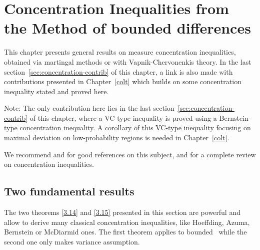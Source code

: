 \chapter{Concentration Inequalities from the Method of bounded differences}
\label{chap:back_concentration}
\begin{chapabstract}
This chapter presents general results on measure concentration inequalities, obtained via martingal methods or with Vapnik-Chervonenkis theory. In the last section~\ref{sec:concentration-contrib} of this chapter, a link is also made with contributions presented in Chapter~\ref{colt} which builds on some concentration inequality stated and proved here.
\end{chapabstract}

Note: The only contribution here lies in the last section~\ref{sec:concentration-contrib} of this chapter, where a VC-type inequality is proved using a Bernstein-type concentration inequality. A corollary of this VC-type inequality focusing on maximal deviation on low-probability regions is needed in Chapter~\ref{colt}.

We recommend \cite{McDiarmid98} and \cite{Janson2002} for good references on this subject, and \cite{Massart2007, BLM2013} for a complete review on concentration inequalities.



\section{Two fundamental results}
The two theorems \ref{3.14} and \ref{3.15} presented in this section are powerful and allow to derive many classical concentration inequalities, like
Hoeffding, Azuma, Bernstein or McDiarmid ones. The first theorem applies to bounded \rv~while the second one only makes variance assumption.

